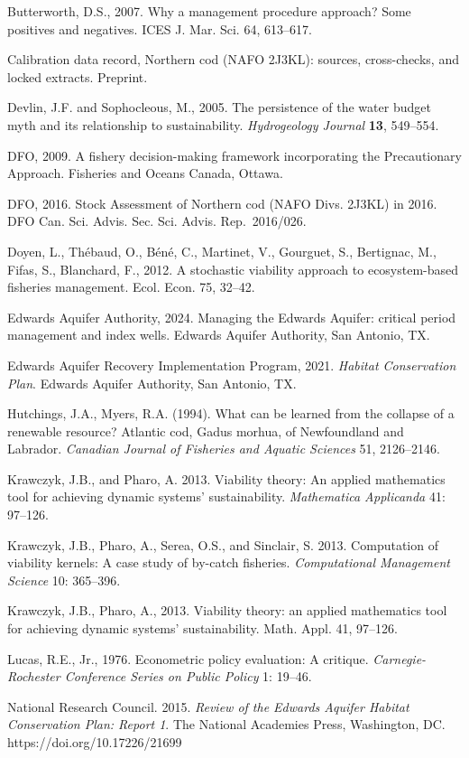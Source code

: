 Butterworth, D.S., 2007. Why a management procedure approach? Some positives and negatives.
ICES J. Mar. Sci. 64, 613--617.

Calibration data record, Northern cod (NAFO 2J3KL):
sources, cross-checks, and locked extracts. Preprint.

Devlin, J.F. and Sophocleous, M., 2005. The persistence of the water budget myth and its
relationship to sustainability. \emph{Hydrogeology Journal} \textbf{13}, 549--554.

DFO, 2009. A fishery decision-making framework incorporating the
Precautionary Approach. Fisheries and Oceans Canada, Ottawa.

DFO, 2016. Stock Assessment of Northern cod (NAFO Divs. 2J3KL) in 2016.
DFO Can. Sci. Advis. Sec. Sci. Advis. Rep.~2016/026.

Doyen, L., Th\'ebaud, O., B\'en\'e, C., Martinet, V., Gourguet, S., Bertignac,
M., Fifas, S., Blanchard, F., 2012. A stochastic viability approach to
ecosystem-based fisheries management. Ecol. Econ. 75, 32--42.

Edwards Aquifer Authority, 2024. Managing the Edwards Aquifer: critical period management and
index wells. Edwards Aquifer Authority, San Antonio, TX.

Edwards Aquifer Recovery Implementation Program, 2021. \emph{Habitat Conservation Plan}. Edwards Aquifer Authority, San Antonio, TX.

Hutchings, J.A., Myers, R.A. (1994). What can be learned from the
collapse of a renewable resource? Atlantic cod, Gadus morhua, of
Newfoundland and Labrador. \emph{Canadian Journal of Fisheries and
Aquatic Sciences} 51, 2126--2146.

Krawczyk, J.B., and Pharo, A. 2013. Viability theory: An applied
mathematics tool for achieving dynamic systems' sustainability.
\emph{Mathematica Applicanda} 41: 97--126.

Krawczyk, J.B., Pharo, A., Serea, O.S., and Sinclair, S. 2013.
Computation of viability kernels: A case study of by-catch fisheries.
\emph{Computational Management Science} 10: 365--396.


Krawczyk, J.B., Pharo, A., 2013. Viability theory: an applied
mathematics tool for achieving dynamic systems' sustainability. Math.
Appl. 41, 97--126.

Lucas, R.E., Jr., 1976. Econometric policy evaluation: A critique.
\emph{Carnegie-Rochester Conference Series on Public Policy} 1: 19--46.

National Research Council. 2015. \emph{Review of the Edwards Aquifer
Habitat Conservation Plan: Report 1}. The National Academies Press,
Washington, DC. https://doi.org/10.17226/21699

